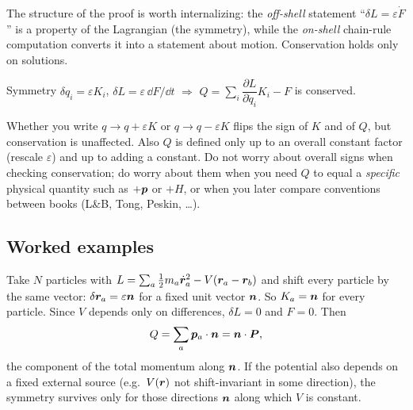 \documentclass[11pt]{article}
\newcommand{\eps}{\varepsilon}
\begin{document}
The structure of the proof is worth internalizing: the \emph{off-shell} statement ``$\delta L=\eps\dot F$'' is a property of the Lagrangian (the symmetry), while the \emph{on-shell} chain-rule computation converts it into a statement about motion. Conservation holds only on solutions.

\begin{keyresult}
Symmetry $\delta q_i=\eps K_i$, $\delta L=\eps\,\dd F/\dd t$ $\Longrightarrow$ $Q=\sum_i\dfrac{\partial L}{\partial\dot q_i}K_i-F$ is conserved.
\end{keyresult}

\begin{pitfall}[Sign conventions for $\eps$]
Whether you write $q\to q+\eps K$ or $q\to q-\eps K$ flips the sign of $K$ and of $Q$, but conservation is unaffected. Also $Q$ is defined only up to an overall constant factor (rescale $\eps$) and up to adding a constant. Do not worry about overall signs when checking conservation; do worry about them when you need $Q$ to equal a \emph{specific} physical quantity such as $+\bm{p}$ or $+H$, or when you later compare conventions between books (L\&B, Tong, Peskin, \dots).
\end{pitfall}

\subsection{Worked examples}

\begin{example}
Take $N$ particles with $L=\sum_a\tfrac12m_a\dot{\bm{r}}_a^2-V(\bm{r}_a-\bm{r}_b)$ and shift every particle by the same vector: $\delta\vect r_a=\eps\vect n$ for a fixed unit vector $\bm{n}$. So $K_{a}=\bm{n}$ for every particle. Since $V$ depends only on differences, $\delta L=0$ and $F=0$. Then
\begin{equation}
  Q=\sum_a\bm{p}_a\cdot\bm{n}=\bm{n}\cdot\bm{P} ,
\end{equation}
the component of the total momentum along $\bm{n}$. If the potential also depends on a fixed external source (e.g.\ $V(\bm{r})$ not shift-invariant in some direction), the symmetry survives only for those directions $\bm{n}$ along which $V$ is constant.
\end{example}
\end{document}
